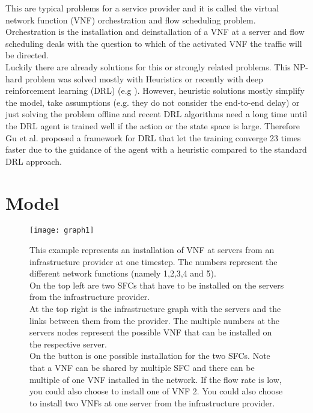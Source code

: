 This are typical problems for a service provider and it is called the virtual network function (VNF) orchestration and flow scheduling problem. Orchestration is the installation and deinstallation of a VNF at a server and flow scheduling deals with the question to which of the activated VNF the traffic will be directed.  \\
Luckily there are already solutions for this or strongly related problems. This NP-hard problem was solved mostly with Heuristics
or recently with deep reinforcement learning (DRL) (e.g \cite{Guz}). However, heuristic solutions mostly simplify the model, take assumptions (e.g. they do not consider the end-to-end delay) or just solving the problem offline and recent DRL algorithms need a long time until the DRL agent is trained well if the action or the state space is large. Therefore Gu et al. \cite{Gu} proposed a framework for DRL that let the training converge 23 times faster due to the guidance of the agent with a heuristic compared to the standard DRL approach.



\section{Model} %
\label{sec:model}

\begin{figure*}[t]
\label{fig:graph}
\centering
\texttt{[image: graph1]}
\caption{This example represents an installation of VNF at servers from an infrastructure provider at one timestep. The numbers represent the different network functions (namely 1,2,3,4 and 5).\\ On the top left are two SFCs that have to be installed on the servers from the infrastructure provider.\\ At the top right is the infrastructure graph with the servers and the links between them from the provider. The multiple numbers at the servers nodes represent the possible VNF that can be installed on the respective server.\\ On the button is one possible installation for the two SFCs. Note that a VNF can be shared by multiple SFC and there can be multiple of one VNF installed in the network. If the flow rate is low, you could also choose to install one of VNF 2. You could also choose to install two VNFs at one server from the infrastructure provider.}
\end{figure*}

